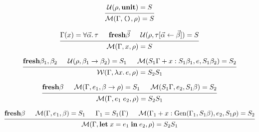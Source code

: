 \documentclass[12pt]{article}
\begin{document}
\pagestyle{empty}

\[
    \begin{prooftree}
        \hypo{\mathcal{U}(\rho, \mathbf{unit}) = S}
        \infer1{\mathcal{M}(\Gamma, \text{\texttt{()}}, \rho) = S}
    \end{prooftree}
\]

\[
    \begin{prooftree}
        \hypo{\Gamma(x) = \forall \vec{\alpha}\ldotp \tau}
        \hypo{\mathbf{fresh} \vec{\beta}}
        \hypo{\mathcal{U}(\rho, \tau[\vec{\alpha} \leftarrow \vec{\beta}]) = S}
        \infer3{\mathcal{M}(\Gamma, x, \rho) = S}
    \end{prooftree}
\]

\[
    \begin{prooftree}
        \hypo{\mathbf{fresh} \beta_1, \beta_2}
        \hypo{\mathcal{U}(\rho, \beta_1 \to \beta_2) = S_1}
        \hypo{\mathcal{M}(S_1\Gamma + x:S_1\beta_1, e, S_1\beta_2) = S_2}
        \infer3{\mathcal{W}(\Gamma, \lambda x\ldotp e, \rho) = S_2S_1}
    \end{prooftree}
\]

\[
    \begin{prooftree}
        \hypo{\mathbf{fresh} \beta}
        \hypo{\mathcal{M}(\Gamma, e_1, \beta \to \rho) = S_1}
        \hypo{\mathcal{M}(S_1\Gamma, e_2, S_1\beta) = S_2}
        \infer3{\mathcal{M}(\Gamma, e_1\; e_2, \rho) = S_2S_1}
    \end{prooftree}
\]

\[
    \begin{prooftree}
        \hypo{\mathbf{fresh} \beta}
        \hypo{\mathcal{M}(\Gamma, e_1, \beta) = S_1}
        \hypo{\Gamma_1 = S_1(\Gamma)}
        \hypo{\mathcal{M}(\Gamma_1 + x:\mathrm{Gen}(\Gamma_1, S_1\beta), e_2, S_1\rho) = S_2}
        \infer4{\mathcal{M}(\Gamma, \mathbf{let}\;x = e_1\;\mathbf{in}\; e_2, \rho) = S_2S_1}
    \end{prooftree}
\]
\end{document}

